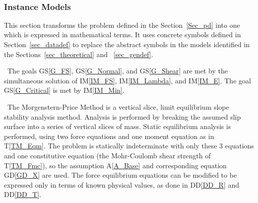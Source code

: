 \documentclass[12pt]{article}
\newcommand{\aref}[1]{A\ref{#1}}
\newcommand{\gsref}[1]{GS\ref{#1}}
\newcommand{\tref}[1]{T\ref{#1}}
\newcommand{\iref}[1]{IM\ref{#1}}
\newcommand{\ddref}[1]{DD\ref{#1}}
\newcommand{\dref}[1]{GD\ref{#1}}
\begin{document}
~\newline

\subsubsection{Instance Models} \label{sec_instance}

This section transforms the problem defined in the
Section~\ref{Sec_pd} into one which is expressed in mathematical
terms. It uses concrete symbols defined in Section~\ref{sec_datadef}
to replace the abstract symbols in the models identified in the
Sections~\ref{sec_theoretical} and ~\ref{sec_gendef}.

~\newline\noindent The goals \gsref{G_FS}, \gsref{G_Normal}, and 
\gsref{G_Shear} are met by the simultaneous solution of \iref{IM_FS}, 
\iref{IM_Lambda}, and \iref{IM_E}. The goal \gsref{G_Critical} is met by
\iref{IM_Min}.

~\newline\noindent The Morgenstern-Price Method is a vertical slice,
limit equilibrium slope stability analysis method. Analysis is
performed by breaking the assumed slip surface into a series of
vertical slices of mass. Static equilibrium analysis is performed, using two 
force equations and one moment equation as in \tref{TM_Eqm}. The problem
is statically indeterminate with only these 3 equations and one
constitutive equation (the Mohr-Coulomb shear strength of
\tref{TM_Fmc}), so the assumption \aref{A_Base} and corresponding equation 
\dref{GD_X} are used. The force equilibrium equations can be modified to be 
expressed only in terms of known physical values, as done in \ddref{DD_R} and 
\ddref{DD_T}.

~\newline

\end{document}
